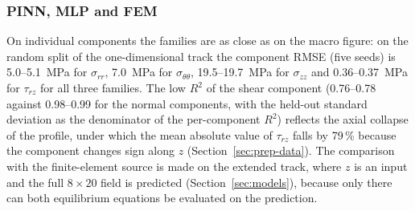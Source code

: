 \documentclass[subscriptcorrection,upint,varvw,barcolor=Goldenrod3,mathalfa=cal=euler,balance,hyphenate,french,pdf-a]{asmejour} %
\begin{document}
\subsubsection{PINN, MLP and FEM}
\label{sec:res_fem}

On individual components the families are as close as on the macro figure: on the random split of the one-dimensional track the component RMSE (five seeds) is 5.0--5.1~MPa for $\sigma_{rr}$, 7.0~MPa for $\sigma_{\theta\theta}$, 19.5--19.7~MPa for $\sigma_{zz}$ and 0.36--0.37~MPa for $\tau_{rz}$ for all three families. The low $R^2$ of the shear component (0.76--0.78 against 0.98--0.99 for the normal components, with the held-out standard deviation as the denominator of the per-component $R^2$) reflects %
the axial collapse of the profile, under which the mean absolute value of $\tau_{rz}$ falls by 79\,\% because the component changes sign along $z$ (Section~\ref{sec:prep-data}). The comparison with the finite-element source is made on the extended track, where $z$ is an input and the full $8\times20$ field is predicted (Section~\ref{sec:models}), because only there can both equilibrium equations be evaluated on the prediction.
\end{document}
